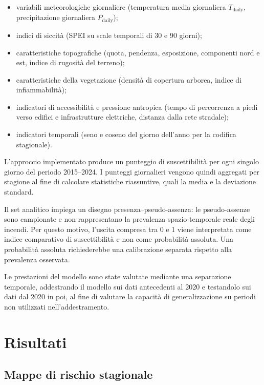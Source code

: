 \documentclass[11pt,a4paper]{article}
\begin{document}
\begin{itemize}
    \item variabili meteorologiche giornaliere (temperatura media giornaliera $T_{\text{daily}}$, precipitazione giornaliera $P_{\text{daily}}$);
    \item indici di siccità (SPEI su scale temporali di 30 e 90 giorni);
    \item caratteristiche topografiche (quota, pendenza, esposizione, componenti nord e est, indice di rugosità del terreno);
    \item caratteristiche della vegetazione (densità di copertura arborea, indice di infiammabilità);
    \item indicatori di accessibilità e pressione antropica (tempo di percorrenza a piedi verso edifici e infrastrutture elettriche, distanza dalla rete stradale);
    \item indicatori temporali (seno e coseno del giorno dell’anno per la codifica stagionale).
\end{itemize}

L’approccio implementato produce un punteggio di suscettibilità per ogni singolo giorno del periodo 2015--2024. I punteggi giornalieri vengono quindi aggregati per stagione al fine di calcolare statistiche riassuntive, quali la media e la deviazione standard.

Il set analitico impiega un disegno presenza--pseudo-assenza: le pseudo-assenze sono campionate e non rappresentano la prevalenza spazio-temporale reale degli incendi. Per questo motivo, l'uscita compresa tra 0 e 1 viene interpretata come indice comparativo di suscettibilità e non come probabilità assoluta. Una probabilità assoluta richiederebbe una calibrazione separata rispetto alla prevalenza osservata.

Le prestazioni del modello sono state valutate mediante una separazione temporale, addestrando il modello sui dati antecedenti al 2020 e testandolo sui dati dal 2020 in poi, al fine di valutare la capacità di generalizzazione su periodi non utilizzati nell'addestramento.

\section{Risultati}

\subsection{Mappe di rischio stagionale}
\end{document}

